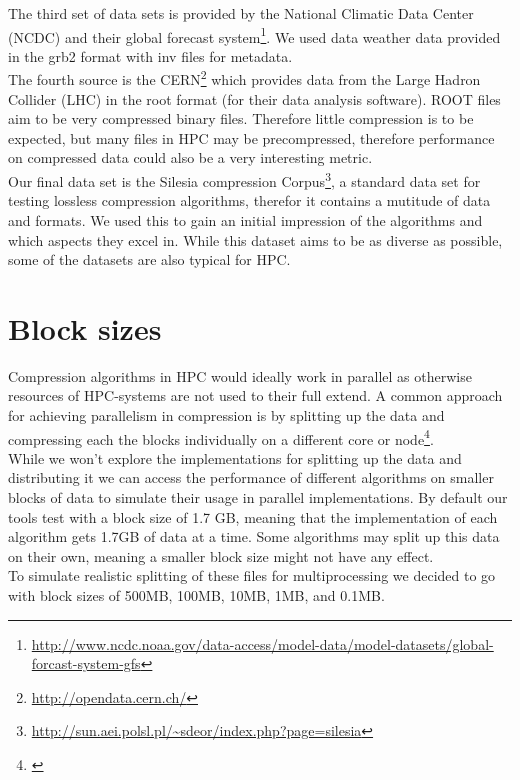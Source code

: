 \documentclass[
	12pt,
	a4paper,
	BCOR10mm,
	DIV14,
	listof=totoc,
	bibliography=totoc,
	headsepline
]{scrreprt}
\newcommand*{\mcite}[1]{\footnote{\cite{#1}}}
\begin{document}
The third set of data sets is provided by the National Climatic Data Center (NCDC) and their global forecast system\footnote{\url{http://www.ncdc.noaa.gov/data-access/model-data/model-datasets/global-forcast-system-gfs}}. 
We used data weather data provided in the grb2 format with inv files for metadata. 
\\

The fourth source is the CERN\footnote{\url{http://opendata.cern.ch/}} which provides data from the Large Hadron Collider (LHC) in the root format (for their data analysis software).
ROOT files aim to be very compressed binary files. Therefore little compression is to be expected, but many files in HPC may be precompressed, therefore performance on compressed data could also be a very interesting metric.
\\

Our final data set is the Silesia compression Corpus\footnote{\url{http://sun.aei.polsl.pl/~sdeor/index.php?page=silesia}}, a standard data set for testing lossless compression algorithms, therefor it contains a mutitude of data and formats. We used this to gain an initial impression of the algorithms and which aspects they excel in. While this dataset aims to be as diverse as possible, some of the datasets are also typical for HPC.
\\

\newpage
\section*{Block sizes}
Compression algorithms in HPC would ideally work in parallel as otherwise resources of HPC-systems are not used to their full extend.
A common approach for achieving parallelism in compression is by splitting up the data and compressing each the blocks individually on a different core or node\mcite{BenComp}. \\
While we won't explore the implementations for splitting up the data and distributing it we can access the performance of different algorithms on smaller blocks of data to simulate their usage in parallel implementations. 
By default our tools test with a block size of 1.7 GB, meaning that the implementation of each algorithm gets 1.7GB of data at a time. 
Some algorithms may split up this data on their own, meaning a smaller block size might not have any effect. \\%
To simulate realistic splitting of these files for multiprocessing we decided to go with block sizes of 500MB, 100MB, 10MB, 1MB, and 0.1MB.
\end{document}
